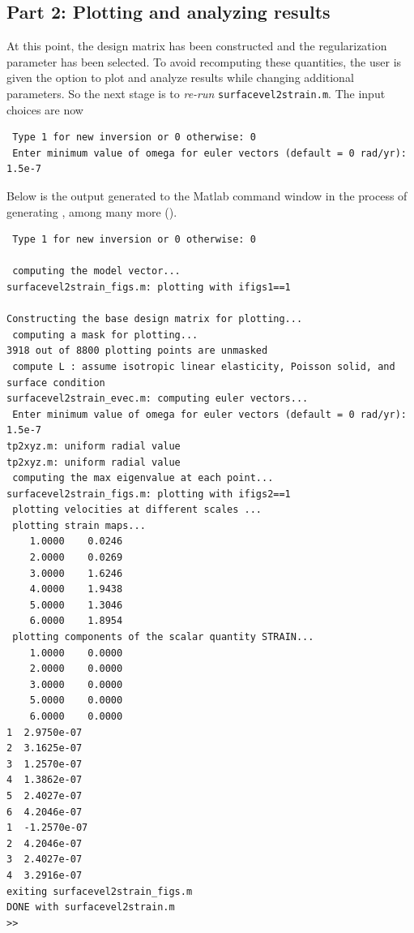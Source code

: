 \documentclass[11pt,titlepage,fleqn]{article}
\begin{document}

\subsection*{Part 2: Plotting and analyzing results}

At this point, the design matrix has been constructed and the regularization parameter has been selected. To avoid recomputing these quantities, the user is given the option to plot and analyze results while changing additional parameters. So the next stage is to {\em re-run} \verb+surfacevel2strain.m+. The input choices are now
%
\begin{spacing}{1.0}
\begin{verbatim}
 Type 1 for new inversion or 0 otherwise: 0
 Enter minimum value of omega for euler vectors (default = 0 rad/yr): 1.5e-7
\end{verbatim}
\end{spacing}
%
Below is the output generated to the Matlab command window in the process of generating , among many more ().

\begin{spacing}{1.0}
\begin{verbatim}
 Type 1 for new inversion or 0 otherwise: 0
  
 computing the model vector...
surfacevel2strain_figs.m: plotting with ifigs1==1
  
Constructing the base design matrix for plotting...
 computing a mask for plotting...
3918 out of 8800 plotting points are unmasked
 compute L : assume isotropic linear elasticity, Poisson solid, and surface condition
surfacevel2strain_evec.m: computing euler vectors...
 Enter minimum value of omega for euler vectors (default = 0 rad/yr): 1.5e-7
tp2xyz.m: uniform radial value
tp2xyz.m: uniform radial value
 computing the max eigenvalue at each point...
surfacevel2strain_figs.m: plotting with ifigs2==1
 plotting velocities at different scales ...
 plotting strain maps...
    1.0000    0.0246
    2.0000    0.0269
    3.0000    1.6246
    4.0000    1.9438
    5.0000    1.3046
    6.0000    1.8954
 plotting components of the scalar quantity STRAIN...
    1.0000    0.0000
    2.0000    0.0000
    3.0000    0.0000
    5.0000    0.0000
    6.0000    0.0000
1  2.9750e-07
2  3.1625e-07
3  1.2570e-07
4  1.3862e-07
5  2.4027e-07
6  4.2046e-07
1  -1.2570e-07
2  4.2046e-07
3  2.4027e-07
4  3.2916e-07
exiting surfacevel2strain_figs.m
DONE with surfacevel2strain.m
>> 
\end{verbatim}
\end{spacing}
\end{document}
